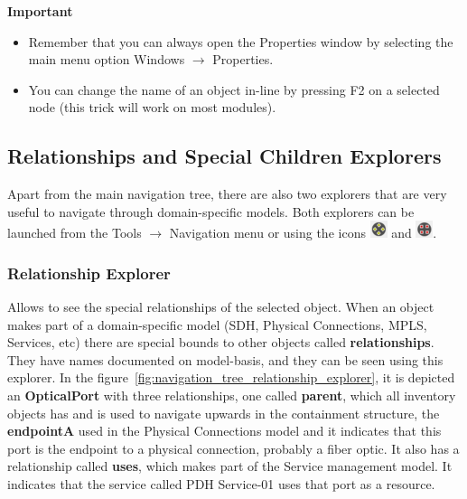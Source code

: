 \documentclass[a4paper]{article}
\begin{document}
	\begin{framed} {\large \textbf{Important}}
		\begin{itemize}
			\item Remember that you can always open the Properties window by selecting the main menu option Windows $\rightarrow$ Properties.
			\item You can change the name of an object in-line by pressing F2 on a selected node (this trick will work on most modules).
		\end{itemize}
	\end{framed}
	\subsection{Relationships and Special Children Explorers} \label{sec:extra_explorers}
	Apart from the main navigation tree, there are also two explorers that are very useful to navigate through domain-specific models. Both explorers can be launched from the Tools $\rightarrow$ Navigation menu or using the icons \includegraphics[width=0.5cm]{img/icon_relationship_explorer.png} and \includegraphics[width=0.5cm]{img/icon_special_children_explorer.png}.

	\subsubsection{Relationship Explorer} \label{sec:extra_explorers_relationship_explorer}
		Allows to see the special relationships of the selected object. When an object makes part of a domain-specific model (SDH, Physical Connections, MPLS, Services, etc) there are special bounds to other objects called \textbf{relationships}. They have names documented on model-basis, and they can be seen using this explorer. In the figure~\ref{fig:navigation_tree_relationship_explorer}, it is depicted an \textbf{OpticalPort} with three relationships, one called \textbf{parent}, which all inventory objects has and is used to navigate upwards in the containment structure, the \textbf{endpointA} used in the Physical Connections model and it indicates that this port is the endpoint to a physical connection, probably a fiber optic. It also has a relationship called \textbf{uses}, which makes part of the Service management model. It indicates that the service called PDH Service-01 uses that port as a resource.
		
\end{document}

